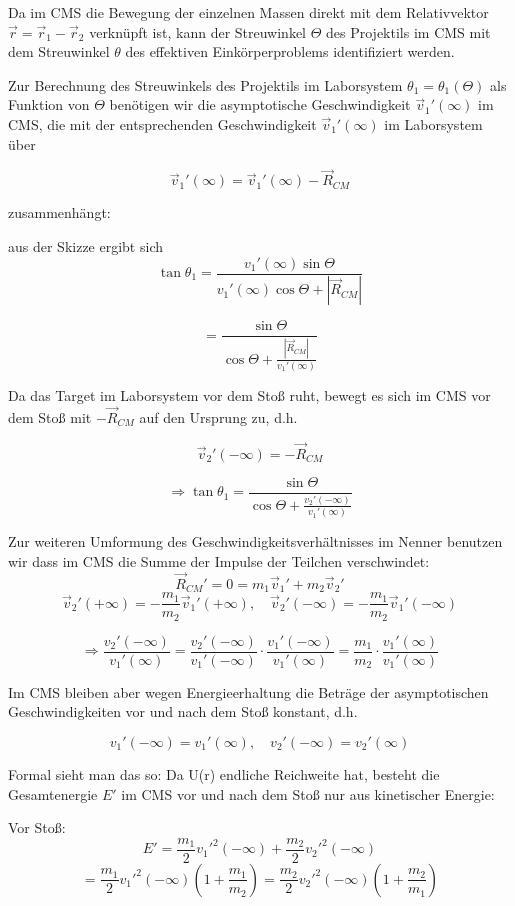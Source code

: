 \documentclass[10pt, letterpaper]{article}
\begin{document}
Da im CMS die Bewegung der einzelnen Massen direkt mit dem Relativvektor $\vec{r}=\vec{r}_1-\vec{r}_2$ verknüpft ist, kann der Streuwinkel $\Theta$ des Projektils im CMS mit dem Streuwinkel $\theta$ des effektiven Einkörperproblems identifiziert werden.

Zur Berechnung des Streuwinkels des Projektils im Laborsystem $\theta_1 = \theta_1(\Theta)$ als Funktion von $\Theta$ benötigen wir die asymptotische Geschwindigkeit $\vec{v}_1'(\infty)$ im CMS, die mit der entsprechenden Geschwindigkeit $\vec{v}_1'(\infty)$ im Laborsystem über

\[\vec{v}_1'(\infty) = \vec{v}_1'(\infty) - \vec{R}_{CM}\]

zusammenhängt:

aus der Skizze ergibt sich
\[\tan\theta_1 = \frac{v_1'(\infty)\sin\Theta}{v_1'(\infty)\cos\Theta + |\vec{R}_{CM}|}\]

\[= \frac{\sin\Theta}{\cos\Theta + \frac{|\vec{R}_{CM}|}{v_1'(\infty)}}\]

Da das Target im Laborsystem vor dem Stoß ruht, bewegt es sich im CMS vor dem Stoß mit $-\vec{R}_{CM}$ auf den Ursprung zu, d.h.

\[\vec{v}_2'(-\infty) = -\vec{R}_{CM}\]

\[\Rightarrow \tan\theta_1 = \frac{\sin\Theta}{\cos\Theta + \frac{v_2'(-\infty)}{v_1'(\infty)}}\]

Zur weiteren Umformung des Geschwindigkeitsverhältnisses im Nenner benutzen wir dass im CMS die Summe der Impulse der Teilchen verschwindet:
\[\vec{R}_{CM}' = 0 = m_1\vec{v}_1' + m_2\vec{v}_2'\]
\[\vec{v}_2'(+\infty) = -\frac{m_1}{m_2}\vec{v}_1'(+\infty), \quad \vec{v}_2'(-\infty) = -\frac{m_1}{m_2}\vec{v}_1'(-\infty)\]

\[\Rightarrow \frac{v_2'(-\infty)}{v_1'(\infty)} = \frac{v_2'(-\infty)}{v_1'(-\infty)}\cdot\frac{v_1'(-\infty)}{v_1'(\infty)} = \frac{m_1}{m_2}\cdot\frac{v_1'(\infty)}{v_1'(\infty)}\]

Im CMS bleiben aber wegen Energieerhaltung die Beträge der asymptotischen Geschwindigkeiten vor und nach dem Stoß konstant, d.h.

\[v_1'(-\infty) = v_1'(\infty), \quad v_2'(-\infty) = v_2'(\infty)\]

Formal sieht man das so: Da U(r) endliche Reichweite hat, besteht die Gesamtenergie $E'$ im CMS vor und nach dem Stoß nur aus kinetischer Energie:

Vor Stoß:
\[E' = \frac{m_1}{2}v_1'^2(-\infty) + \frac{m_2}{2}v_2'^2(-\infty)\]
\[= \frac{m_1}{2}v_1'^2(-\infty)\left(1+\frac{m_1}{m_2}\right) = \frac{m_2}{2}v_2'^2(-\infty)\left(1+\frac{m_2}{m_1}\right)\]
\end{document}
